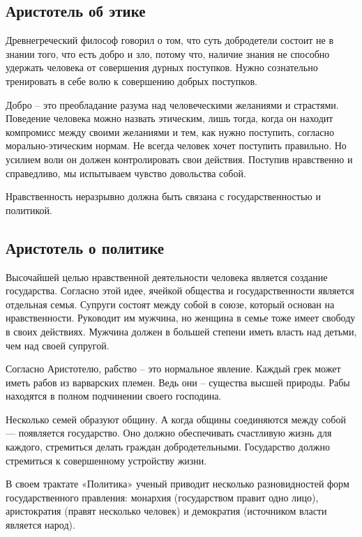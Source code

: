\documentclass[a4paper, 14pt]{extreport}
\begin{document}
\subsection{Аристотель об этике}

Древнегреческий философ говорил о том, что суть добродетели состоит не в
знании того, что есть добро и зло, потому что, наличие знания не
способно удержать человека от совершения дурных поступков. Нужно
сознательно тренировать в себе волю к совершению добрых поступков.

Добро -- это преобладание разума над человеческими желаниями и
страстями. Поведение человека можно назвать этическим, лишь тогда, когда
он находит компромисс между своими желаниями и тем, как нужно поступить,
согласно морально-этическим нормам. Не всегда человек хочет поступить
правильно. Но усилием воли он должен контролировать свои действия.
Поступив нравственно и справедливо, мы испытываем чувство довольства
собой.

Нравственность неразрывно должна быть связана с государственностью и
политикой.

\subsection{Аристотель о политике}

Высочайшей целью нравственной деятельности человека является создание
государства. Согласно этой идее, ячейкой общества и государственности
является отдельная семья. Супруги состоят между собой в союзе, который
основан на нравственности. Руководит им мужчина, но женщина в семье тоже
имеет свободу в своих действиях. Мужчина должен в большей степени иметь
власть над детьми, чем над своей супругой.

Согласно Аристотелю, рабство -- это нормальное явление. Каждый грек
может иметь рабов из варварских племен. Ведь они -- существа высшей
природы. Рабы находятся в полном подчинении своего господина.

Несколько семей образуют общину. А когда общины соединяются между собой
--- появляется государство. Оно должно обеспечивать счастливую жизнь для
каждого, стремиться делать граждан добродетельными. Государство должно
стремиться к совершенному устройству жизни.

В своем трактате «Политика» ученый приводит несколько разновидностей
форм государственного правления: монархия (государством правит одно
лицо), аристократия (правят несколько человек) и демократия (источником
власти является народ).
\end{document}
